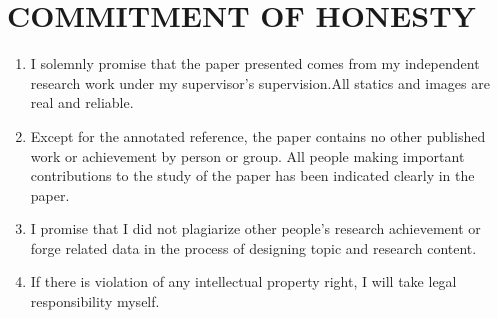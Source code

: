 \chapter*{COMMITMENT OF HONESTY}
\label{chap:honest}

\begin{enumerate}
    \item I solemnly promise that the paper presented comes from my independent research work under my supervisor's supervision.All statics and images are real and reliable.
    \item Except for the annotated reference, the paper contains no other published work or achievement by person or group. All people making important contributions to the study of the paper has been indicated clearly in the paper.
    \item I promise that I did not plagiarize other people's research achievement or forge related data in the process of designing topic and research content.
    \item If there is violation of any intellectual property right, I will take legal responsibility myself.
\end{enumerate}

\baselineskip

